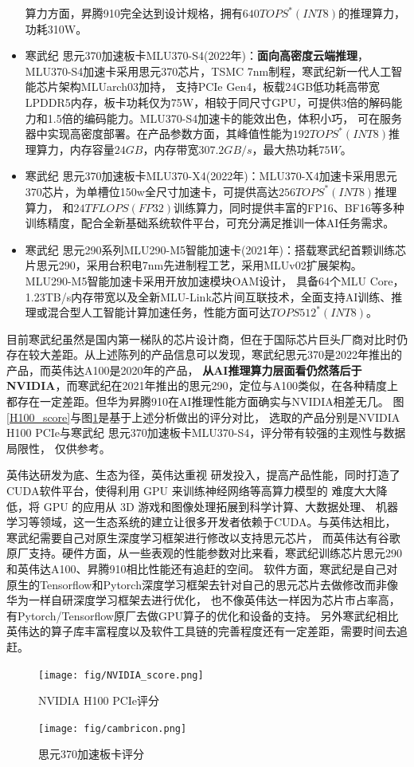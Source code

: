 \begin{itemize}
    算力方面，昇腾910完全达到设计规格，拥有$640TOPS^*(INT8)$的推理算力，功耗310W。
    \item 寒武纪 思元370加速板卡MLU370-S4(2022年)：\textbf{面向高密度云端推理}，MLU370-S4加速卡采用思元370芯片，TSMC 7nm制程，寒武纪新一代人工智能芯片架构MLUarch03加持，
    支持PCIe Gen4，板载24GB低功耗高带宽LPDDR5内存，板卡功耗仅为75W，相较于同尺寸GPU，可提供3倍的解码能力和1.5倍的编码能力。MLU370-S4加速卡的能效出色，体积小巧，
    可在服务器中实现高密度部署。在产品参数方面，其峰值性能为$192TOPS^*(INT8)$推理算力，内存容量$24GB$，内存带宽$307.2GB/s$，最大热功耗$75W$。
    \item 寒武纪 思元370加速板卡MLU370-X4(2022年)：MLU370-X4加速卡采用思元370芯片，为单槽位150w全尺寸加速卡，可提供高达$256TOPS^*(INT8)$推理算力，
    和$24TFLOPS(FP32)$训练算力，同时提供丰富的FP16、BF16等多种训练精度，配合全新基础系统软件平台，可充分满足推训一体AI任务需求。
    \item 寒武纪 思元290系列MLU290-M5智能加速卡(2021年)：搭载寒武纪首颗训练芯片思元290，采用台积电7nm先进制程工艺，采用MLUv02扩展架构。MLU290-M5智能加速卡采用开放加速模块OAM设计，
    具备64个MLU Core，1.23TB/s内存带宽以及全新MLU-Link芯片间互联技术，全面支持AI训练、推理或混合型人工智能计算加速任务，性能方面可达$TOPS512^*(INT8)$。
\end{itemize}

目前寒武纪虽然是国内第一梯队的芯片设计商，但在于国际芯片巨头厂商对比时仍存在较大差距。从上述陈列的产品信息可以发现，寒武纪思元370是2022年推出的产品，而英伟达A100是2020年的产品，
\textbf{从AI推理算力层面看仍然落后于NVIDIA}，而寒武纪在2021年推出的思元290，定位与A100类似，在各种精度上都存在一定差距。但华为昇腾910在AI推理性能方面确实与NVIDIA相差无几。
图\ref{H100_score}与图\ref{cambricon_score}是基于上述分析做出的评分对比，
选取的产品分别是NVIDIA H100 PCIe与寒武纪 思元370加速板卡MLU370-S4，评分带有较强的主观性与数据局限性，
仅供参考。\par
英伟达研发为底、生态为径，英伟达重视
研发投入，提高产品性能，同时打造了CUDA软件平台，使得利用 GPU 来训练神经网络等高算力模型的
难度大大降低，将 GPU 的应用从 3D 游戏和图像处理拓展到科学计算、大数据处理、
机器学习等领域，这一生态系统的建立让很多开发者依赖于CUDA。与英伟达相比，
寒武纪需要自己对原生深度学习框架进行修改以支持思元芯片，
而英伟达有谷歌原厂支持。硬件方面，从一些表观的性能参数对比来看，寒武纪训练芯片思元290和英伟达A100、昇腾910相比性能还有追赶的空间。
软件方面，寒武纪是自己对原生的Tensorflow和Pytorch深度学习框架去针对自己的思元芯片去做修改而非像华为一样自研深度学习框架去进行优化，
也不像英伟达一样因为芯片市占率高，有Pytorch/Tensorflow原厂去做GPU算子的优化和设备的支持。
另外寒武纪相比英伟达的算子库丰富程度以及软件工具链的完善程度还有一定差距，需要时间去追赶。
\begin{figure}[htb]
  \centering
\begin{minipage}{0.49\linewidth}
  \centering
  \texttt{[image: fig/NVIDIA\_score.png]}
  \caption{NVIDIA H100 PCIe评分}\label{H100_score}
\end{minipage}
\begin{minipage}{0.47\linewidth}
  \centering
  \texttt{[image: fig/cambricon.png]}
  \caption{思元370加速板卡评分}\label{cambricon_score}
\end{minipage}
\end{figure}
